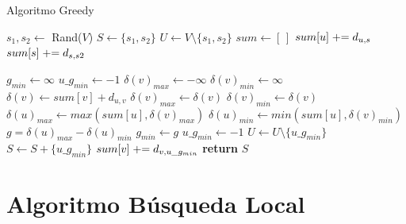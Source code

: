 \begin{algorithm}[H]
\caption{Algoritmo Greedy}
\begin{algorithmic}[1]
\State $s_1, s_2 \gets$ Rand($V$) 
\State $S \gets \{s_1,s_2\}$
\State $U \gets V \setminus \{s_1,s_2\}$  
\State 
\State $sum \gets [ \, ]$ 
 
        \State $sum[u] \mathrel{+}= d_{u,s}$
    \EndFor
\EndFor
{}
        \State $sum[s] \mathrel{+}= d_{s,s2}$
    \EndFor
\EndFor
{}
\end{algorithmic}
\end{algorithm}

\begin{algorithm}[H]
\begin{algorithmic}
 
    \State $g_{min} \gets \infty$
    \State $u\_g_{min} \gets -1$
    \State
        \State $\delta(v)_{max} \gets -\infty$
        \State $\delta(v)_{min} \gets \infty$
        \State
            \State $\delta(v) \gets sum[v] + d_{u,v}$
                \State $\delta(v)_{max} \gets \delta(v)$
            \EndIf
                \State $\delta(v)_{min} \gets \delta(v)$
            \EndIf
            \State
            \State $\delta(u)_{max} \gets max(sum[u], \delta(v)_{max})$
            \State $\delta(u)_{min} \gets min(sum[u], \delta(v)_{min})$
            \State $g = \delta(u)_{max} - \delta(u)_{min}$
                \State $g_{min} \gets g$
                \State $u\_g_{min} \gets -1$
            \EndIf
        \EndFor
        \State
        \State $U \gets U \setminus \{u\_g_{min}\}$
        \State $S \gets S + \{u\_g_{min}\}$
    \EndFor
    \State
        \State $sum[v] \mathrel{+}= d_{v,u\_g_{min}}$
    \EndFor
\EndWhile
\State
\State \textbf{return} $S$ 
\end{algorithmic}
\end{algorithm}

\newpage
\section{Algoritmo Búsqueda Local}


